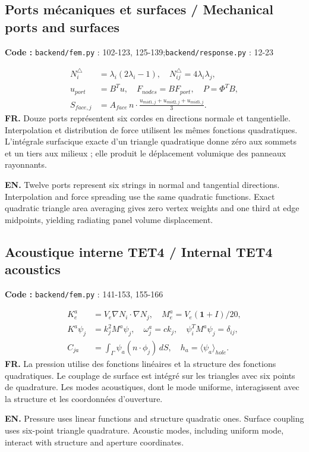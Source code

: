 \documentclass[10pt,a4paper]{article}
\newcommand{\FR}[1]{\textbf{FR.} #1\par}\newcommand{\EN}[1]{{\selectlanguage{english}\textbf{EN.} #1\par}}
\newcommand{\loc}[1]{{\small\color{ink}\textbf{Code :} #1\par}}
\begin{document}
\begin{samepage}\subsection{Ports mécaniques et surfaces / Mechanical ports and surfaces}
\loc{\texttt{backend/fem.py} : 102-123, 125-139;\allowbreak\quad \texttt{backend/response.py} : 12-23}
\begin{align}N_i^\triangle&=\lambda_i(2\lambda_i-1),\quad N_{ij}^\triangle=4\lambda_i\lambda_j,\\
u_{port}&=B^Tu,\quad F_{nodes}=BF_{port},\quad P=\Phi^TB,\\
S_{face,j}&=A_{face}\,n\cdot\frac{u_{mid1,j}+u_{mid2,j}+u_{mid3,j}}3 .\end{align}
\FR{Douze ports représentent six cordes en directions normale et tangentielle. Interpolation et distribution de force utilisent les mêmes fonctions quadratiques. L’intégrale surfacique exacte d’un triangle quadratique donne zéro aux sommets et un tiers aux milieux ; elle produit le déplacement volumique des panneaux rayonnants.}
\EN{Twelve ports represent six strings in normal and tangential directions. Interpolation and force spreading use the same quadratic functions. Exact quadratic triangle area averaging gives zero vertex weights and one third at edge midpoints, yielding radiating panel volume displacement.}
\end{samepage}
\begin{samepage}\subsection{Acoustique interne TET4 / Internal TET4 acoustics}
\loc{\texttt{backend/fem.py} : 141-153, 155-166}
\begin{align}K^a_e&=V_e\nabla N_i\cdot\nabla N_j,\quad M^a_e=V_e(\mathbf1+I)/20,\\
K^a\psi_j&=k_j^2M^a\psi_j,\quad\omega^a_j=c k_j,\quad\psi_i^TM^a\psi_j=\delta_{ij},\\
C_{ja}&=\int_{\Gamma}\psi_a(n\cdot\phi_j)\,dS,\quad h_a=\langle\psi_a\rangle_{hole}.\end{align}
\FR{La pression utilise des fonctions linéaires et la structure des fonctions quadratiques. Le couplage de surface est intégré sur les triangles avec six points de quadrature. Les modes acoustiques, dont le mode uniforme, interagissent avec la structure et les coordonnées d’ouverture.}
\EN{Pressure uses linear functions and structure quadratic ones. Surface coupling uses six-point triangle quadrature. Acoustic modes, including uniform mode, interact with structure and aperture coordinates.}
\end{samepage}
\end{document}
